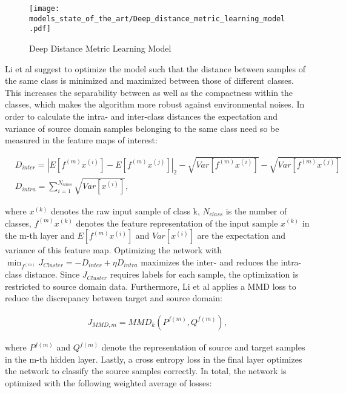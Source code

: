\begin{figure}[H]
  \centering
  \texttt{[image: models\_state\_of\_the\_art/Deep\_distance\_metric\_learning\_model.pdf]}
  \caption{Deep Distance Metric Learning Model \cite{Li2018}}
  \label{fig:Deep_distance_metric_learning_model}
\end{figure}

Li et al suggest to optimize the model such that the distance between samples of the same class is minimized and maximized between those of different classes. This increases the separability between as well as the compactness within the classes, which makes the algorithm more robust against environmental noises. In order to calculate the intra- and inter-class distances the expectation and variance of source domain samples belonging to the same class need so be measured in the feature maps of interest:

\begin{equation}
    \begin{aligned}
       &D_{inter} = |E[f^{(m)}x^{(i)}]-E[f^{(m)}x^{(j)}]|_{2}-\sqrt{Var[f^{(m)}x^{(i)}]}-\sqrt{Var[f^{(m)}x^{(j)}]}\\
       &D_{intra} = 
        \sum_{i=1}^{N_{class}} \sqrt{Var[x^{(i)}]},
    \end{aligned}
\end{equation}

where $x^{(k)}$ denotes the raw input sample of class k, $N_{class}$ is the number of classes, $f^{(m)}x^{(k)}$ denotes the feature representation of the input sample $x^{(k)}$ in the m-th layer and $E[f^{(m)}x^{(i)}]$ and $Var[x^{(i)}]$ are the  expectation and variance of this feature map. Optimizing the network with $\min_{f^{(m)}}J_{Cluster} = - D_{inter} + \eta D_{intra}$ maximizes the inter- and reduces the intra-class distance. Since $J_{Cluster}$  requires labels for each sample, the optimization is restricted to source domain data. Furthermore, Li et al applies a MMD loss to reduce the discrepancy between target and source domain: 

\begin{equation}
    \begin{aligned}
    J_{MMD,m} = MMD_{k}(P^{f(m)}, Q^{f(m)}),
    \end{aligned}
\end{equation}

where $P^{f(m)}$ and $Q^{f(m)}$ denote the representation of source and target samples in the m-th hidden layer. Lastly, a cross entropy loss in the final layer optimizes the network to classify the source samples correctly. In total, the network is optimized with the following weighted average of losses: 

